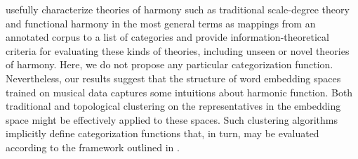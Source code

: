 \cite{jacoby_information_2015} usefully characterize theories of harmony such as traditional scale-degree theory and functional harmony in the most general terms as mappings from an annotated corpus to a list of categories and provide information-theoretical criteria for evaluating these kinds of theories, including unseen or novel theories of harmony. Here, we do not propose any particular categorization function. Nevertheless, our results suggest that the structure of word embedding spaces trained on musical data captures some intuitions about harmonic function. Both traditional and topological clustering on the representatives in the embedding space might be effectively applied to these spaces. Such clustering algorithms implicitly define categorization functions that, in turn, may be evaluated according to the framework outlined in \cite{jacoby_information_2015}.

